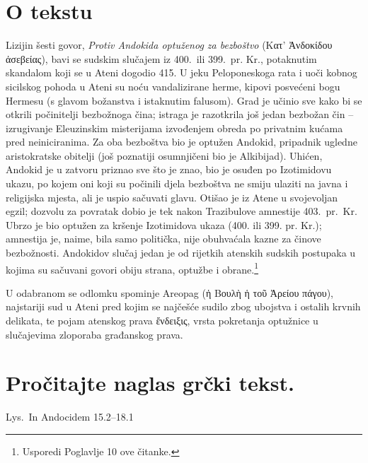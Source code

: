 
\section*{O tekstu}

Lizijin šesti govor, \textit{Protiv Andokida optuženog za bezboštvo} \textgreek{(Κατ' Ἀνδοκίδου ἀσεβείας),} bavi se sudskim slučajem iz 400.\ ili 399.\ pr. Kr., potaknutim skandalom koji se u Ateni dogodio 415. U jeku Peloponeskoga rata i uoči kobnog sicilskog pohoda u Ateni su noću vandalizirane herme, kipovi posvećeni bogu Hermesu (s glavom božanstva i istaknutim falusom). Grad je učinio sve kako bi se otkrili počinitelji bezbožnoga čina; istraga je razotkrila još jedan bezbožan čin – izrugivanje Eleuzinskim misterijama izvođenjem obreda po privatnim kućama pred neiniciranima. Za oba bezboštva bio je optužen Andokid, pripadnik ugledne aristokratske obitelji (još poznatiji osumnjičeni bio je Alkibijad). Uhićen, Andokid je u zatvoru priznao sve što je znao, bio je osuđen po Izotimidovu ukazu, po kojem oni koji su počinili djela bezboštva ne smiju ulaziti na javna i religijska mjesta, ali je uspio sačuvati glavu. Otišao je iz Atene u svojevoljan egzil; dozvolu za povratak dobio je tek nakon Trazibulove amnestije 403.\ pr.~Kr. Ubrzo je bio optužen za kršenje Izotimidova ukaza (400. ili 399. pr. Kr.); amnestija je, naime, bila samo politička, nije obuhvaćala kazne za činove bezbožnosti. Andokidov slučaj jedan je od rijetkih atenskih sudskih postupaka u kojima su sačuvani govori obiju strana, optužbe i obrane.\footnote{Usporedi Poglavlje 10 ove čitanke.}

U odabranom se odlomku spominje Areopag \textgreek{(ἡ Βουλὴ ἡ τοῦ Ἀρείου πάγου),} najstariji sud u Ateni pred kojim se najčešće sudilo zbog ubojstva i ostalih krvnih delikata, te pojam atenskog prava \textgreek{ἔνδειξις,} vrsta pokretanja optužnice u slučajevima zloporaba građanskog prava. 



\section*{Pročitajte naglas grčki tekst.}

Lys.\ In Andocidem 15.2–18.1


\medskip


